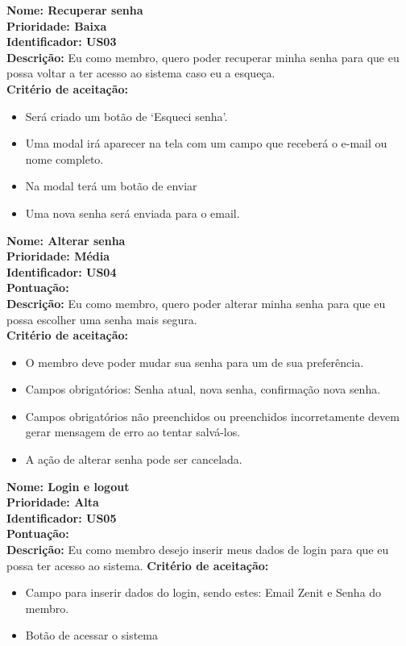 \begin{anexosenv}
\textbf{Nome: Recuperar senha\\
Prioridade: Baixa\\
Identificador: US03 \\
Descrição: }Eu como membro, quero poder recuperar minha senha para que eu possa voltar a ter acesso ao sistema caso eu a esqueça.\\
\textbf{Critério de aceitação:}
\begin{itemize}
    \item Será criado um botão de ‘Esqueci senha’.
    \item Uma modal irá aparecer na tela com um campo que receberá o e-mail ou nome completo.
    \item Na modal terá um botão de enviar
    \item Uma nova senha será enviada para o email.
\end{itemize}

\textbf{Nome: Alterar senha\\
Prioridade: Média\\
Identificador: US04\\
Pontuação: \\
Descrição: }Eu como membro, quero poder alterar minha senha para que eu possa escolher uma senha mais segura.\\
\textbf{Critério de aceitação:}
\begin{itemize}
    \item O membro deve poder mudar sua senha para um de sua preferência.
    \item Campos obrigatórios: Senha atual, nova senha, confirmação nova senha.
    \item Campos obrigatórios não preenchidos ou preenchidos incorretamente devem gerar mensagem de erro ao tentar salvá-los.
    \item A ação de alterar senha pode ser cancelada.
\end{itemize}

\textbf{Nome: Login e logout\\
Prioridade: Alta\\
Identificador: US05\\
Pontuação:\\
Descrição:} Eu como membro desejo inserir meus dados de login para que eu possa ter acesso ao sistema.
\textbf{Critério de aceitação: }
\begin{itemize}
    \item Campo para inserir dados do login, sendo estes: Email Zenit e Senha do membro.
    \item Botão de acessar o sistema
\end{itemize}


\end{anexosenv}

